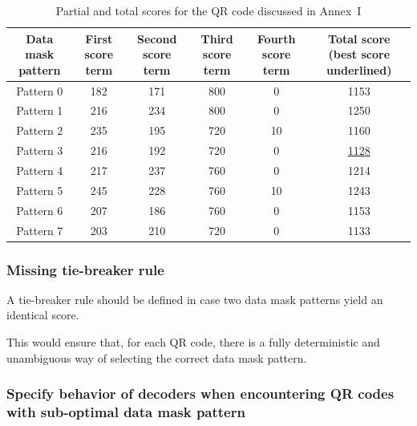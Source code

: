 \documentclass[a4paper,twoside]{article}
\newcommand{\best}[1]{\underline{#1}}
\begin{document}
\begin{table}[h!]
\centering
\tiny
\begin{tabular}{|c|c|c|c|c|c|}
\hline
Data mask pattern & First score term & Second score term & Third score term & Fourth score term & Total score (best score underlined) \\
\hline
Pattern 0            & 182              & 171               & 800              &  0                & 1153        \\
Pattern 1            & 216              & 234               & 800              &  0                & 1250        \\
Pattern 2            & 235              & 195               & 720              & 10                & 1160        \\
Pattern 3            & 216              & 192               & 720              &  0                & \best{1128} \\
Pattern 4            & 217              & 237               & 760              &  0                & 1214        \\
Pattern 5            & 245              & 228               & 760              & 10                & 1243        \\
Pattern 6            & 207              & 186               & 760              &  0                & 1153        \\
Pattern 7            & 203              & 210               & 720              &  0                & 1133        \\
\hline
\end{tabular}
\caption{Partial and total scores for the QR code discussed in Annex~I}
\label{tab:dmp-selection-annex-example}
\end{table}

\subsubsection*{Missing tie-breaker rule}

A tie-breaker rule should be defined in case two data mask patterns yield an identical score.

This would ensure that, for each QR code, there is a fully deterministic and unambiguous way of selecting the
correct data mask pattern.

\subsubsection*{Specify behavior of decoders when encountering QR codes with sub-optimal data mask pattern}
\end{document}
